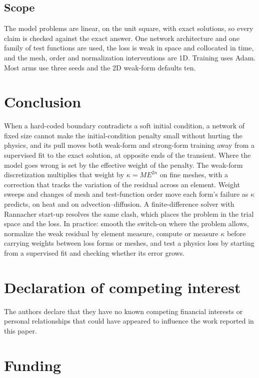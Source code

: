 \documentclass[a4paper,fleqn]{cas-sc}
\begin{document}
\subsection{Scope}
The model problems are linear, on the unit square, with exact solutions, so every claim is checked
against the exact answer. One network architecture and one family of test functions are used, the loss is weak in space
and collocated in time, and the mesh, order and normalization interventions are 1D. Training uses Adam. Most arms use three seeds and
the 2D weak-form defaults ten.

\section{Conclusion}
\label{sec:conclusion}

When a hard-coded boundary contradicts a soft initial condition, a network of fixed size cannot make the
initial-condition penalty small without hurting the physics, and its pull moves both weak-form and strong-form training away from a supervised fit to the exact
solution, at opposite ends of the transient. Where the model goes wrong is set by the effective weight of the penalty.
The weak-form discretization multiplies that weight by $\kappa=ME^{2n}$ on fine meshes, with a correction that tracks the
variation of the residual across an element. Weight sweeps and changes of mesh and test-function order move each form's
failure as $\kappa$ predicts, on heat and on advection--diffusion. A finite-difference solver with Rannacher start-up
resolves the same clash, which places the problem in the trial space and the loss. In practice: smooth the switch-on
where the problem allows, normalize the weak residual by element measure, compute or measure $\kappa$ before carrying
weights between loss forms or meshes, and test a physics loss by starting from a supervised fit and checking whether its
error grows.

\printcredits

\section*{Declaration of competing interest}
The authors declare that they have no known competing financial interests or personal relationships that could have
appeared to influence the work reported in this paper.

\section*{Funding}
\end{document}
